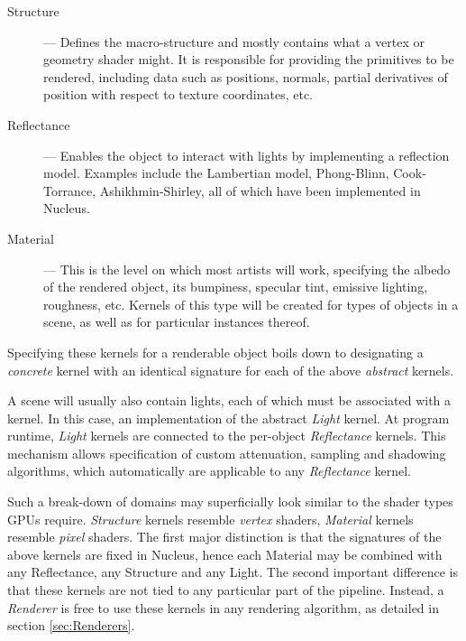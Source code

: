 \begin{description}

\item[Structure] --- Defines the macro-structure and mostly contains what a vertex or geometry shader might. It is responsible for providing the primitives to be rendered, including data such as positions, normals, partial derivatives of position with respect to texture coordinates, etc.

\item[Reflectance] --- Enables the object to interact with lights by implementing a reflection model. Examples include the Lambertian model, Phong-Blinn, Cook-Torrance, Ashikhmin-Shirley, all of which have been implemented in Nucleus.

\item[Material] --- This is the level on which most artists will work, specifying the albedo of the rendered object, its bumpiness, specular tint, emissive lighting, roughness, etc. Kernels of this type will be created for types of objects in a scene, as well as for particular instances thereof.

\end{description}

Specifying these kernels for a renderable object boils down to designating a \emph{concrete} kernel with an identical signature for each of the above \emph{abstract} kernels.

A scene will usually also contain lights, each of which must be associated with a kernel. In this case, an implementation of the abstract \emph{Light} kernel. At program runtime, \emph{Light} kernels are connected to the per-object \emph{Reflectance} kernels. This mechanism allows specification of custom attenuation, sampling and shadowing algorithms, which automatically are applicable to any \emph{Reflectance} kernel.


Such a break-down of domains may superficially look similar to the shader types GPUs require. \emph{Structure} kernels resemble \emph{vertex} shaders, \emph{Material} kernels resemble \emph{pixel} shaders. The first major distinction is that the signatures of the above kernels are fixed in Nucleus, hence each Material may be combined with any Reflectance, any Structure and any Light. The second important difference is that these kernels are not tied to any particular part of the pipeline. Instead, a \emph{Renderer} is free to use these kernels in any rendering algorithm, as detailed in section \ref{sec:Renderers}.

